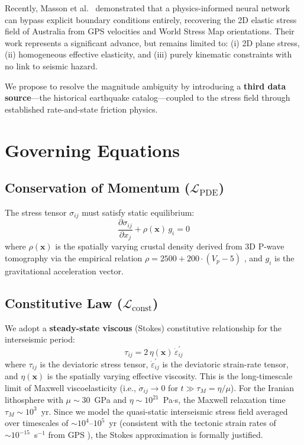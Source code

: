 \documentclass[11pt, a4paper]{article}
\begin{document}
Recently, Masson et al.\ \cite{Masson2023} demonstrated that a physics-informed neural network can bypass explicit boundary conditions entirely, recovering the 2D elastic stress field of Australia from GPS velocities and World Stress Map orientations. Their work represents a significant advance, but remains limited to: (i) 2D plane stress, (ii) homogeneous effective elasticity, and (iii) purely kinematic constraints with no link to seismic hazard.

We propose to resolve the magnitude ambiguity by introducing a \textbf{third data source}---the historical earthquake catalog---coupled to the stress field through established rate-and-state friction physics.

\section{Governing Equations}

\subsection{Conservation of Momentum ($\mathcal{L}_{\text{PDE}}$)}
The stress tensor $\sigma_{ij}$ must satisfy static equilibrium:
\begin{equation}
    \frac{\partial \sigma_{ij}}{\partial x_j} + \rho(\mathbf{x})\, g_i = 0
    \label{eq:momentum}
\end{equation}
where $\rho(\mathbf{x})$ is the spatially varying crustal density derived from 3D P-wave tomography via the empirical relation $\rho = 2500 + 200 \cdot (V_p - 5)$ \cite{BroNoy2008}, and $g_i$ is the gravitational acceleration vector.

\subsection{Constitutive Law ($\mathcal{L}_{\text{const}}$)}
We adopt a \textbf{steady-state viscous} (Stokes) constitutive relationship for the interseismic period:
\begin{equation}
    \tau_{ij} = 2\,\eta(\mathbf{x})\,\dot{\varepsilon}^{\prime}_{ij}
    \label{eq:constitutive}
\end{equation}
where $\tau_{ij}$ is the deviatoric stress tensor, $\dot{\varepsilon}^{\prime}_{ij}$ is the deviatoric strain-rate tensor, and $\eta(\mathbf{x})$ is the spatially varying effective viscosity. This is the long-timescale limit of Maxwell viscoelasticity (i.e., $\dot{\sigma}_{ij} \to 0$ for $t \gg \tau_M = \eta/\mu$). For the Iranian lithosphere with $\mu \sim 30$~GPa and $\eta \sim 10^{21}$~Pa$\cdot$s, the Maxwell relaxation time $\tau_M \sim 10^{3}$~yr. Since we model the quasi-static interseismic stress field averaged over timescales of $\sim 10^{4}$--$10^{5}$~yr (consistent with the tectonic strain rates of $\sim 10^{-15}$~s$^{-1}$ from GPS \cite{Khorrami2019}), the Stokes approximation is formally justified.
\end{document}
